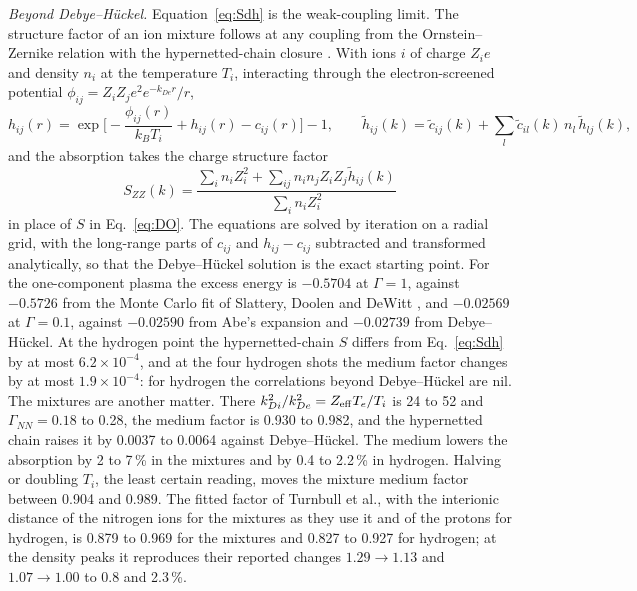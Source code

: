 \documentclass[11pt]{article}
\numberwithin{equation}{section}
\newcommand{\kB}{k_B}
\begin{document}
{\noindent}\emph{Beyond Debye--H\"uckel.} Equation~\eqref{eq:Sdh} is the weak-coupling limit. The
structure factor of an ion mixture follows at any coupling from the Ornstein--Zernike relation
with the hypernetted-chain closure \cite{Morita1958}. With ions $i$ of charge $Z_ie$ and density
$n_i$ at the temperature $T_i$, interacting through the electron-screened potential
$\phi_{ij}=Z_iZ_je^2e^{-k_{De}r}/r$,
\begin{equation}
h_{ij}(r)=\exp\Big[-\frac{\phi_{ij}(r)}{\kB T_i}+h_{ij}(r)-c_{ij}(r)\Big]-1,\qquad
\tilde h_{ij}(k)=\tilde c_{ij}(k)+\sum_l\tilde c_{il}(k)\,n_l\,\tilde h_{lj}(k),
\label{eq:hnc}
\end{equation}
and the absorption takes the charge structure factor
\begin{equation}
S_{ZZ}(k)=\frac{\sum_in_iZ_i^2+\sum_{ij}n_in_jZ_iZ_j\tilde h_{ij}(k)}{\sum_in_iZ_i^2}
\label{eq:SZZ}
\end{equation}
in place of $S$ in Eq.~\eqref{eq:DO}. The equations are solved by iteration on a radial grid, with the
long-range parts of $c_{ij}$ and $h_{ij}-c_{ij}$ subtracted and transformed analytically, so that
the Debye--H\"uckel solution is the exact starting point. For the one-component plasma the
excess energy is $-0.5704$ at $\Gamma=1$, against $-0.5726$ from the Monte Carlo fit of Slattery,
Doolen and DeWitt \cite{Slattery1982}, and $-0.02569$ at $\Gamma=0.1$, against $-0.02590$ from Abe's
expansion \cite{Abe1959} and $-0.02739$ from Debye--H\"uckel. At the hydrogen point the
hypernetted-chain $S$ differs from Eq.~\eqref{eq:Sdh} by at most $6.2\times10^{-4}$, and at the four
hydrogen shots the medium factor changes by at most $1.9\times10^{-4}$: for hydrogen the correlations
beyond Debye--H\"uckel are nil. The mixtures are another matter. There
$k_{Di}^2/k_{De}^2=Z_{\rm eff}T_e/T_i$ is 24 to 52 and $\Gamma_{NN}=0.18$ to 0.28, the medium factor is 0.930 to 0.982, and the
hypernetted chain raises it by 0.0037 to 0.0064 against Debye--H\"uckel. The medium lowers the
absorption by 2 to 7\,\% in the mixtures and by 0.4 to 2.2\,\% in hydrogen. Halving or
doubling $T_i$, the least certain reading, moves the mixture medium factor between 0.904 and 0.989.
The fitted factor of Turnbull et al., with the interionic distance of the nitrogen ions for the
mixtures as they use it and of the protons for hydrogen, is 0.879 to 0.969 for the mixtures and
0.827 to 0.927 for hydrogen; at the density peaks it reproduces their reported changes
$1.29\to1.13$ and $1.07\to1.00$ to 0.8 and 2.3\,\%.
\end{document}
